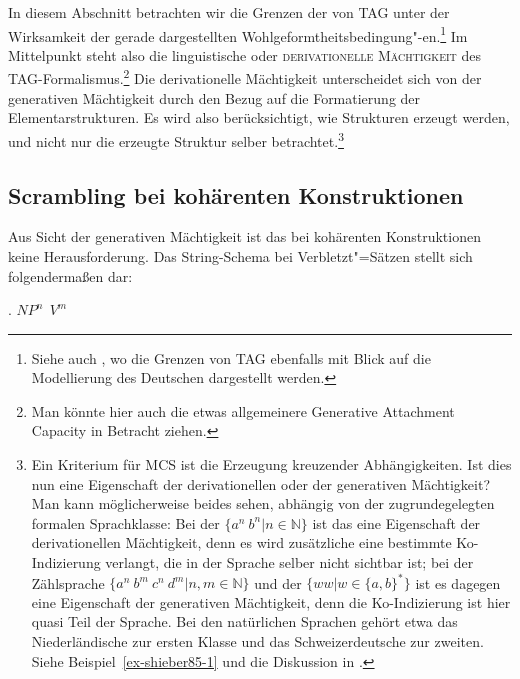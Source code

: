 In diesem Abschnitt betrachten wir die Grenzen der  von TAG unter der Wirksamkeit der gerade dargestellten Wohlgeformtheitsbedingung"-en.\footnote{Siehe auch \citet[Section~2.4]{Gerdes:02b}, wo die Grenzen von TAG ebenfalls mit Blick auf die Modellierung des Deutschen dargestellt werden.} Im Mittelpunkt steht also die linguistische oder \textsc{derivationelle Mächtigkeit}  \citep{Becker:Rambow:Niv:92} des TAG-Formalis\-mus.\footnote{Man könnte hier auch die etwas allgemeinere Generative Attachment Capacity \citep{Kallmeyer:06} in Betracht ziehen.} Die derivationelle Mächtigkeit unterscheidet sich von der generativen Mächtigkeit durch den Bezug auf die Formatierung der Elementarstrukturen. Es wird also berücksichtigt, wie Strukturen erzeugt werden, und nicht nur die erzeugte Struktur selber betrachtet.\footnote{Ein Kriterium für MCS ist die Erzeugung kreuzender Abhängigkeiten. Ist dies nun eine Eigenschaft der derivationellen oder der generativen Mächtigkeit? Man kann möglicherweise beides sehen, abhängig von der zugrundegelegten formalen Sprachklasse: Bei der  $\{a^n ~ b^n | n \in \mathbb{N}\}$ ist das eine Eigenschaft der derivationellen Mächtigkeit, denn es wird zusätzliche eine bestimmte Ko-Indizierung verlangt, die in der Sprache selber nicht sichtbar ist; bei der Zählsprache $\{a^n ~ b^m ~ c^n ~ d^m | n,m \in \mathbb{N}\}$ und der  $\{ww|w\in\{a,b\}^*\}$ ist es dagegen eine Eigenschaft der generativen Mächtigkeit, denn die Ko-Indizierung ist hier quasi Teil der Sprache. Bei den natürlichen Sprachen gehört etwa das Niederländische zur ersten Klasse und das Schweizerdeutsche zur zweiten. Siehe Beispiel~\ref{ex-shieber85-1} und die Diskussion in \cite{Shieber:85}.} 

\subsection{Scrambling bei kohärenten Konstruktionen} \label{sec-tag-grenzen-scram}

Aus Sicht der generativen Mächtigkeit ist das  bei kohärenten Konstruktionen keine Herausforderung. Das String-Schema bei Verbletzt"=Sätzen \linebreak stellt sich folgenderma\ss en dar:

\ex. $\mathit{NP}^n ~~ V^m$

